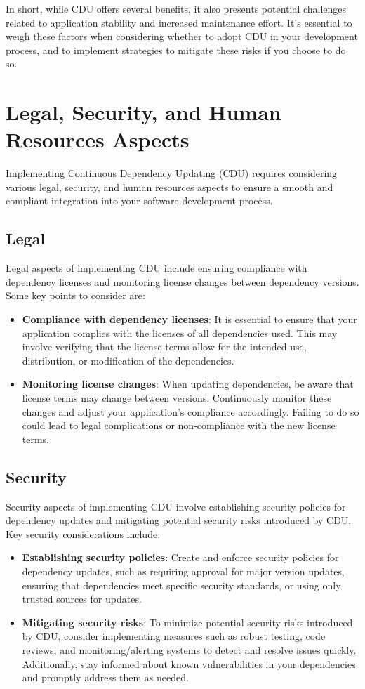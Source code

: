 \documentclass[10pt]{article}
\begin{document}
In short, while CDU offers several benefits, it also presents potential challenges related to application stability and increased maintenance effort. It's essential to weigh these factors when considering whether to adopt CDU in your development process, and to implement strategies to mitigate these risks if you choose to do so.

\section{Legal, Security, and Human Resources Aspects}
Implementing Continuous Dependency Updating (CDU) requires considering various legal, security, and human resources aspects to ensure a smooth and compliant integration into your software development process.

\subsection{Legal}
Legal aspects of implementing CDU include ensuring compliance with dependency licenses and monitoring license changes between dependency versions. Some key points to consider are:

\begin{itemize}
  \item \textbf{Compliance with dependency licenses}: It is essential to ensure that your application complies with the licenses of all dependencies used. This may involve verifying that the license terms allow for the intended use, distribution, or modification of the dependencies.
  \item \textbf{Monitoring license changes}: When updating dependencies, be aware that license terms may change between versions. Continuously monitor these changes and adjust your application's compliance accordingly. Failing to do so could lead to legal complications or non-compliance with the new license terms.
\end{itemize}

\subsection{Security}
Security aspects of implementing CDU involve establishing security policies for dependency updates and mitigating potential security risks introduced by CDU. Key security considerations include:

\begin{itemize}
  \item \textbf{Establishing security policies}: Create and enforce security policies for dependency updates, such as requiring approval for major version updates, ensuring that dependencies meet specific security standards, or using only trusted sources for updates.
  \item \textbf{Mitigating security risks}: To minimize potential security risks introduced by CDU, consider implementing measures such as robust testing, code reviews, and monitoring/alerting systems to detect and resolve issues quickly. Additionally, stay informed about known vulnerabilities in your dependencies and promptly address them as needed.
\end{itemize}
\end{document}
